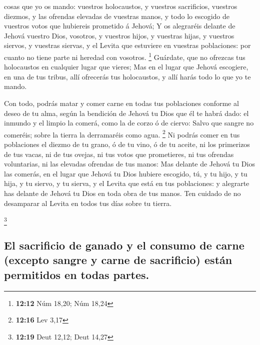 cosas que yo os mando: vuestros holocaustos, y vuestros sacrificios,
vuestros diezmos, y las ofrendas elevadas de vuestras manos, y todo lo
escogido de vuestros votos que hubiereis prometido á Jehová;
 Y os alegraréis delante de Jehová vuestro Dios, vosotros,
y vuestros hijos, y vuestras hijas, y vuestros siervos, y vuestras
siervas, y el Levita que estuviere en vuestras poblaciones: por cuanto
no tiene parte ni heredad con vosotros. \footnote{\textbf{12:12} Núm
  18,20; Núm 18,24}  Guárdate, que no ofrezcas tus
holocaustos en cualquier lugar que vieres;  Mas en el lugar
que Jehová escogiere, en una de tus tribus, allí ofrecerás tus
holocaustos, y allí harás todo lo que yo te mando.

 Con todo, podrás matar y comer carne en todas tus
poblaciones conforme al deseo de tu alma, según la bendición de Jehová
tu Dios que él te habrá dado: el inmundo y el limpio la comerá, como la
de corzo ó de ciervo:  Salvo que sangre no comeréis; sobre
la tierra la derramaréis como agua. \footnote{\textbf{12:16} Lev 3,17}
 Ni podrás comer en tus poblaciones el diezmo de tu grano,
ó de tu vino, ó de tu aceite, ni los primerizos de tus vacas, ni de tus
ovejas, ni tus votos que prometieres, ni tus ofrendas voluntarias, ni
las elevadas ofrendas de tus manos:  Mas delante de Jehová
tu Dios las comerás, en el lugar que Jehová tu Dios hubiere escogido,
tú, y tu hijo, y tu hija, y tu siervo, y tu sierva, y el Levita que está
en tus poblaciones: y alegrarte has delante de Jehová tu Dios en toda
obra de tus manos.  Ten cuidado de no desamparar al Levita
en todos tus días sobre tu tierra.

\footnote{\textbf{12:19} Deut 12,12; Deut 14,27}

\hypertarget{el-sacrificio-de-ganado-y-el-consumo-de-carne-excepto-sangre-y-carne-de-sacrificio-estuxe1n-permitidos-en-todas-partes.}{%
\subsection{El sacrificio de ganado y el consumo de carne (excepto
sangre y carne de sacrificio) están permitidos en todas
partes.}\label{el-sacrificio-de-ganado-y-el-consumo-de-carne-excepto-sangre-y-carne-de-sacrificio-estuxe1n-permitidos-en-todas-partes.}}

